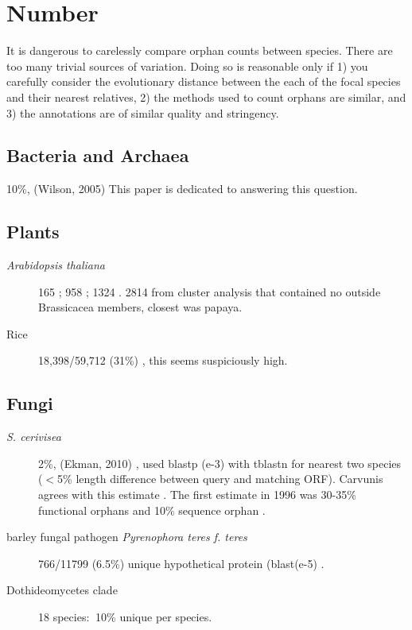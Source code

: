 \section{Number}

It is dangerous to carelessly compare orphan counts between species. There are
too many trivial sources of variation. Doing so is reasonable only if 1) you
carefully consider the evolutionary distance between the each of the focal
species and their nearest relatives, 2) the methods used to count orphans are
similar, and 3) the annotations are of similar quality and stringency.

\subsection{Bacteria and Archaea}

  10\%, (Wilson, 2005) \cite{wilson_orphans_2005} This paper is dedicated
  to answering this question.

\subsection{Plants}

  \begin{description}

    \item[\textit{Arabidopsis thaliana}] 165 \cite{yang_genome-wide_2009};
      958 \cite{donoghue_evolutionary_2011}; 1324
      \cite{lin_comparative_2010}. 2814 from cluster analysis that
      contained no outside Brassicacea members, closest was papaya.
      \cite{ye_evolutionary_2013}

    \item[Rice] 18,398/59,712 (31\%) \cite{guo_significant_2007}, this
      seems suspiciously high.

  \end{description}

\subsection{Fungi}

  \begin{description}

    \item[\textit{S. cerivisea}] 2\%, (Ekman, 2010)
      \cite{ekman_identifying_2010}, used blastp (e-3) with tblastn for
      nearest two species ($<$5\% length difference between query and
      matching ORF). Carvunis agrees with this estimate
      \cite{carvunis_proto-genes_2012}. The first estimate in 1996 was
      30-35\% functional orphans \cite{dujon_yeast_1996} and 10\%
      sequence orphan \cite{casari_bioinformatics_1996}.

    \item[barley fungal pathogen \textit{Pyrenophora teres f. teres}]
      766/11799 (6.5\%) unique hypothetical protein (blast(e-5) \cite{ellwood_first_2010}.

    \item[Dothideomycetes clade] 18 species: $~$10\% unique per species.
      \cite{ohm_diverse_2012}
  
  \end{description}

